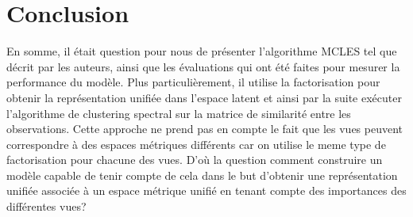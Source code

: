 \documentclass[12pt, french, latin.medieval, a4paper]{report}
\begin{document}
	\section{Conclusion}
	En somme, il était question pour nous de présenter l'algorithme MCLES tel que décrit par les auteurs, ainsi que les évaluations qui ont été faites pour mesurer la performance du modèle.
	Plus particulièrement, il utilise la factorisation pour obtenir la représentation unifiée dans l'espace latent et ainsi par la suite exécuter l'algorithme de clustering spectral sur la matrice de similarité entre les observations. 
	Cette approche ne prend pas en compte le fait que les vues peuvent correspondre à des espaces métriques différents car on utilise le meme type de factorisation pour chacune des vues.
	D'où la question comment construire un modèle capable de tenir compte de cela dans le but d’obtenir une représentation unifiée associée à un espace métrique unifié en tenant compte des importances des différentes vues?
    
   

    
\end{document}
